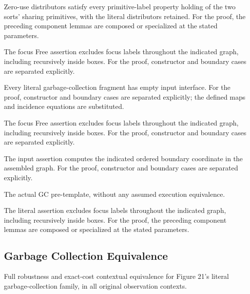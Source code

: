 Zero-use distributors satisfy every primitive-label property holding of the two sorts' sharing primitives, with the literal distributors retained.
For the proof, the preceding component lemmas are composed or specialized at the stated parameters.
\par{}

The focus Free assertion excludes focus labels throughout the indicated graph, including recursively inside boxes.
For the proof, constructor and boundary cases are separated explicitly.
\par{}

Every literal garbage-collection fragment has empty input interface.
For the proof, constructor and boundary cases are separated explicitly; the defined maps and incidence equations are substituted.
\par{}

The focus Free assertion excludes focus labels throughout the indicated graph, including recursively inside boxes.
For the proof, constructor and boundary cases are separated explicitly.
\par{}

The input assertion computes the indicated ordered boundary coordinate in the assembled graph.
For the proof, constructor and boundary cases are separated explicitly.
\par{}

The actual GC pre-template, without any assumed execution equivalence.
\par{}

The literal assertion excludes focus labels throughout the indicated graph, including recursively inside boxes.
For the proof, the preceding component lemmas are composed or specialized at the stated parameters.
\par{}

\subsection{Garbage Collection Equivalence}
Full robustness and exact-cost contextual equivalence for Figure 21's literal garbage-collection family, in all original observation contexts.

